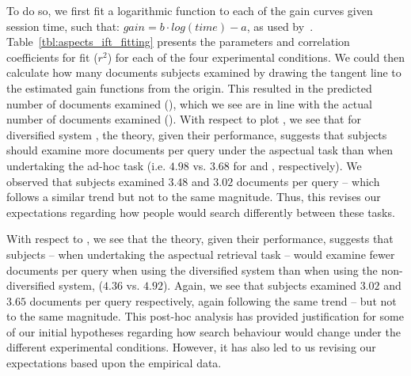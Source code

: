 To do so, we first fit a logarithmic function to each of the gain curves given session time, such that: $gain = b \cdot log(time) - a$, as used by~\cite{athukorala2014ift}. Table~\ref{tbl:aspects_ift_fitting} presents the parameters and correlation coefficients for fit ($r^2$) for each of the four experimental conditions. We could then calculate how many documents subjects examined by drawing the tangent line to the estimated gain functions from the origin. This resulted in the predicted number of documents examined (), which we see are in line with the actual number of documents examined (). With respect to plot , we see that for diversified system , the theory, given their performance, suggests that subjects should examine more documents per query under the aspectual task  than when undertaking the ad-hoc task  (i.e. $4.98$ vs. $3.68$ for  and , respectively). We observed that subjects examined $3.48$ and $3.02$ documents per query -- which follows a similar trend but not to the same magnitude. Thus, this revises our expectations regarding how people would search differently between these tasks.
\vspace*{-4mm}

With respect to , we see that the theory, given their performance, suggests that subjects -- when undertaking the aspectual retrieval task -- would examine fewer documents per query when using the diversified system  than when using the non-diversified system,  ($4.36$ vs. $4.92$). Again, we see that subjects examined $3.02$ and $3.65$ documents per query respectively, again following the same trend -- but not to the same magnitude. This post-hoc analysis has provided justification for some of our initial hypotheses regarding how search behaviour would change under the different experimental conditions. However, it has also led to us revising our expectations based upon the empirical data.

